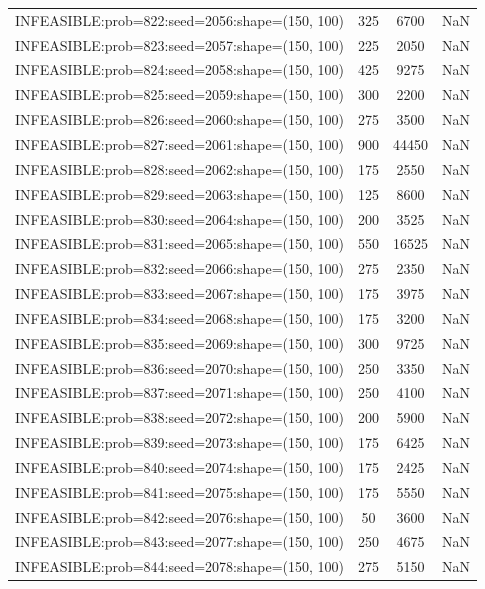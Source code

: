 \begin{longtable}{lccc}
INFEASIBLE:prob=822:seed=2056:shape=(150, 100) &      325 &  6700 &    NaN \\
INFEASIBLE:prob=823:seed=2057:shape=(150, 100) &      225 &  2050 &    NaN \\
INFEASIBLE:prob=824:seed=2058:shape=(150, 100) &      425 &  9275 &    NaN \\
INFEASIBLE:prob=825:seed=2059:shape=(150, 100) &      300 &  2200 &    NaN \\
INFEASIBLE:prob=826:seed=2060:shape=(150, 100) &      275 &  3500 &    NaN \\
INFEASIBLE:prob=827:seed=2061:shape=(150, 100) &      900 & 44450 &    NaN \\
INFEASIBLE:prob=828:seed=2062:shape=(150, 100) &      175 &  2550 &    NaN \\
INFEASIBLE:prob=829:seed=2063:shape=(150, 100) &      125 &  8600 &    NaN \\
INFEASIBLE:prob=830:seed=2064:shape=(150, 100) &      200 &  3525 &    NaN \\
INFEASIBLE:prob=831:seed=2065:shape=(150, 100) &      550 & 16525 &    NaN \\
INFEASIBLE:prob=832:seed=2066:shape=(150, 100) &      275 &  2350 &    NaN \\
INFEASIBLE:prob=833:seed=2067:shape=(150, 100) &      175 &  3975 &    NaN \\
INFEASIBLE:prob=834:seed=2068:shape=(150, 100) &      175 &  3200 &    NaN \\
INFEASIBLE:prob=835:seed=2069:shape=(150, 100) &      300 &  9725 &    NaN \\
INFEASIBLE:prob=836:seed=2070:shape=(150, 100) &      250 &  3350 &    NaN \\
INFEASIBLE:prob=837:seed=2071:shape=(150, 100) &      250 &  4100 &    NaN \\
INFEASIBLE:prob=838:seed=2072:shape=(150, 100) &      200 &  5900 &    NaN \\
INFEASIBLE:prob=839:seed=2073:shape=(150, 100) &      175 &  6425 &    NaN \\
INFEASIBLE:prob=840:seed=2074:shape=(150, 100) &      175 &  2425 &    NaN \\
INFEASIBLE:prob=841:seed=2075:shape=(150, 100) &      175 &  5550 &    NaN \\
INFEASIBLE:prob=842:seed=2076:shape=(150, 100) &       50 &  3600 &    NaN \\
INFEASIBLE:prob=843:seed=2077:shape=(150, 100) &      250 &  4675 &    NaN \\
INFEASIBLE:prob=844:seed=2078:shape=(150, 100) &      275 &  5150 &    NaN \\

\end{longtable}
